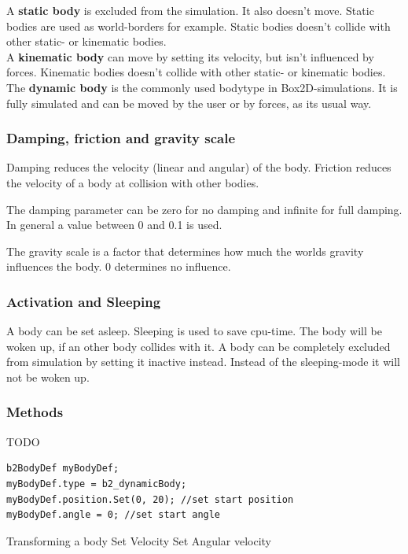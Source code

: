 \documentclass[10pt,a4paper,DIV=11]{scrreprt}
\begin{document}
A \textbf{static body} is excluded from the simulation. It also doesn't move. Static bodies are used as world-borders for example. Static bodies doesn't collide with other static- or kinematic bodies. \\

A \textbf{kinematic body} can move by setting its velocity, but isn't influenced by forces.
Kinematic bodies doesn't collide with other static- or kinematic bodies.\\

The \textbf{dynamic body} is the commonly used bodytype in Box2D-simulations. It is fully simulated and can be moved by the user or by forces, as its usual way.

\subsubsection*{Damping, friction and gravity scale}
Damping reduces the velocity (linear and angular) of the body.
Friction reduces the velocity of a body at collision with other bodies.

The damping parameter can be zero for no damping and infinite for full damping. In general a value between 0 and 0.1 is used.

The gravity scale is a factor that determines how much the worlds gravity influences the body. 0 determines no influence.

\subsubsection*{Activation and Sleeping}
A body can be set asleep. Sleeping is used to save cpu-time. The body will be woken up, if an other body collides with it.
A body can be completely excluded from simulation by setting it inactive instead.
Instead of the sleeping-mode it will not be woken up.

\subsubsection*{Methods}
TODO

\begin{lstlisting}[caption={Setting body definitions},label=lst:bodydef]
b2BodyDef myBodyDef;
myBodyDef.type = b2_dynamicBody;
myBodyDef.position.Set(0, 20); //set start position
myBodyDef.angle = 0; //set start angle
\end{lstlisting}


Transforming a body
Set Velocity
Set Angular velocity
\end{document}
